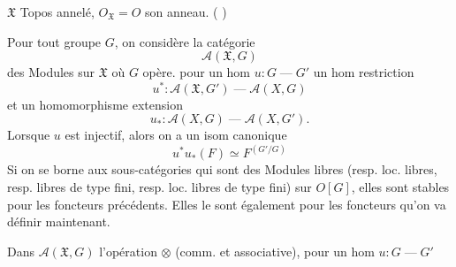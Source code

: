  $\mathfrak X$ Topos annelé, $O_{\mathfrak X}=O$ son anneau. ( )

Pour tout groupe $G$, on considère la catégorie
\[
\mathcal A(\mathfrak X,G)
\]
des Modules sur $\mathfrak X$ où $G$ opère.  pour un hom $u:G\mathrel{\text{---}}G'$ un hom restriction
\[
u^*:\mathcal A(\mathfrak X,G')\mathrel{\text{---}}\mathcal A(X,G)
\]
et un homomorphisme extension
\[
u_*:\mathcal A(X,G)\mathrel{\text{---}}\mathcal A(X,G').
\]
Lorsque $u$ est injectif, alors on a  un isom   canonique
\[
u^*u_*(F)\simeq F^{(G'/G)}
\]
Si on se borne aux sous-catégories qui sont  des Modules libres (resp. loc. libres, resp. libres de type fini, resp. loc. libres de type fini) sur $O[G]$, elles sont stables pour les foncteurs précédents. Elles le sont également pour les foncteurs qu'on va définir maintenant.

Dans $\mathcal A(\mathfrak X,G)$  l'opération $\otimes$ (comm. et associative), pour un hom $u:G\mathrel{\text{---}}G'$
